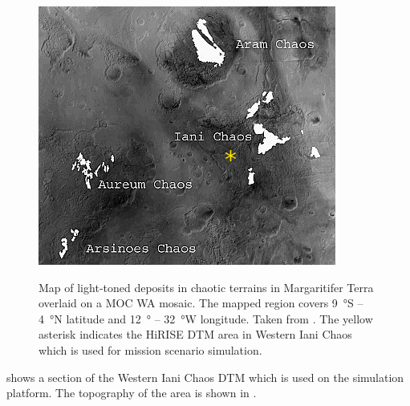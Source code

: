 \begin{figure}[h]
  \centering
  \hypersetup{linkcolor=captionTextColor}
  \includegraphics[width=0.45\linewidth]{sections/mars-solar-energy/mission-sites/images/iani-chaos-deposits.png}\\
  \caption[Map of light‐toned deposits in chaotic terrains in Margaritifer Terra]
          {Map of light‐toned deposits in chaotic terrains in Margaritifer Terra overlaid on a \ac{MOC} \ac{WA} mosaic. The mapped region covers \SI{9}{\degree}S – \SI{4}{\degree}N latitude and \SI{12}{\degree} – \SI{32}{\degree}W longitude. Taken from . The yellow asterisk indicates the \ac{HiRISE} \ac{DTM} area in Western Iani Chaos which is used for mission scenario simulation.}
  \label{fig:mission-site-iani-chaos}
\end{figure}

 shows a section of the Western Iani Chaos \ac{DTM} which is used on the simulation platform. The topography of the area is shown in .

\vspace{0.5cm}


